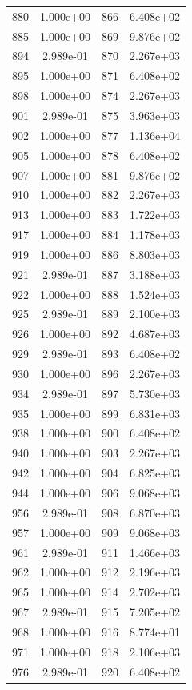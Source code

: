 \documentclass[12pt]{article}
\begin{document}
\begin{longtable}{@{}cccc@{}}
880 & 1.000e+00 & 866 & 6.408e+02 \\
885 & 1.000e+00 & 869 & 9.876e+02 \\
894 & 2.989e-01 & 870 & 2.267e+03 \\
895 & 1.000e+00 & 871 & 6.408e+02 \\
898 & 1.000e+00 & 874 & 2.267e+03 \\
901 & 2.989e-01 & 875 & 3.963e+03 \\
902 & 1.000e+00 & 877 & 1.136e+04 \\
905 & 1.000e+00 & 878 & 6.408e+02 \\
907 & 1.000e+00 & 881 & 9.876e+02 \\
910 & 1.000e+00 & 882 & 2.267e+03 \\
913 & 1.000e+00 & 883 & 1.722e+03 \\
917 & 1.000e+00 & 884 & 1.178e+03 \\
919 & 1.000e+00 & 886 & 8.803e+03 \\
921 & 2.989e-01 & 887 & 3.188e+03 \\
922 & 1.000e+00 & 888 & 1.524e+03 \\
925 & 2.989e-01 & 889 & 2.100e+03 \\
926 & 1.000e+00 & 892 & 4.687e+03 \\
929 & 2.989e-01 & 893 & 6.408e+02 \\
930 & 1.000e+00 & 896 & 2.267e+03 \\
934 & 2.989e-01 & 897 & 5.730e+03 \\
935 & 1.000e+00 & 899 & 6.831e+03 \\
938 & 1.000e+00 & 900 & 6.408e+02 \\
940 & 1.000e+00 & 903 & 2.267e+03 \\
942 & 1.000e+00 & 904 & 6.825e+03 \\
944 & 1.000e+00 & 906 & 9.068e+03 \\
956 & 2.989e-01 & 908 & 6.870e+03 \\
957 & 1.000e+00 & 909 & 9.068e+03 \\
961 & 2.989e-01 & 911 & 1.466e+03 \\
962 & 1.000e+00 & 912 & 2.196e+03 \\
965 & 1.000e+00 & 914 & 2.702e+03 \\
967 & 2.989e-01 & 915 & 7.205e+02 \\
968 & 1.000e+00 & 916 & 8.774e+01 \\
971 & 1.000e+00 & 918 & 2.106e+03 \\
976 & 2.989e-01 & 920 & 6.408e+02 \\

\end{longtable}
\end{document}
